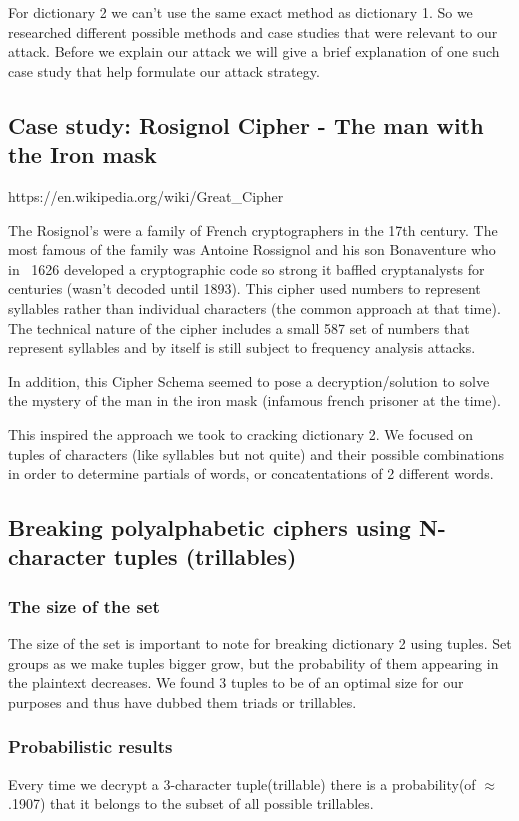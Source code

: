 \documentclass[pdftex,12pt,letter]{article}
\begin{document}
For dictionary 2 we can't use the same exact method as dictionary 1.
So we researched different possible methods and case studies that were 
relevant to our attack. Before we explain our attack we will give a 
brief explanation of one such case study that help formulate our attack
strategy.  

\subsection{Case study: Rosignol Cipher - The man with the Iron mask}
https://en.wikipedia.org/wiki/Great\_Cipher

The Rosignol's were a family of French cryptographers in the 17th century.
The most famous of the family was Antoine Rossignol and his son Bonaventure
who in ~1626 developed a cryptographic code so strong it baffled cryptanalysts for 
centuries (wasn't decoded until 1893). This cipher used numbers to represent syllables 
rather than individual characters (the common approach at that time). The technical 
nature of the cipher includes a small 587 set of numbers that represent syllables 
and by itself is still subject to frequency analysis attacks. 

In addition, this Cipher Schema seemed to pose a decryption/solution to solve the 
mystery of the man in the iron mask (infamous french prisoner at the time). 

This inspired the approach we took to cracking dictionary 2. We focused on 
tuples of characters (like syllables but not quite) and their possible combinations
in order to determine partials of words, or concatentations of 2 different words. 


\subsection{Breaking polyalphabetic ciphers using N-character tuples (trillables)}

\subsubsection{The size of the set}
The size of the set is important to note for breaking dictionary 2 using tuples. 
Set groups as we make tuples bigger grow, but the probability of them appearing
in the plaintext decreases. We found 3 tuples to be of an optimal size for our
purposes and thus have dubbed them triads or trillables. 
\subsubsection{Probabilistic results}
Every time we decrypt a 3-character tuple(trillable) there is a 
probability(of $\approx$ .1907) that it belongs to the subset of all possible trillables. 
\end{document}
